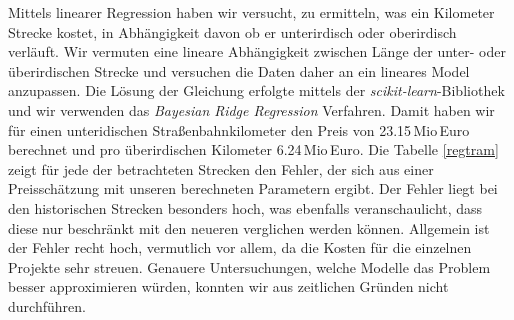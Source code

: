 Mittels linearer Regression haben wir versucht, zu ermitteln, was ein Kilometer Strecke kostet, in Abhängigkeit davon ob er unterirdisch oder oberirdisch verläuft. Wir vermuten eine lineare Abhängigkeit zwischen Länge der unter- oder überirdischen Strecke und versuchen die Daten daher an ein lineares Model anzupassen. Die Lösung der Gleichung erfolgte mittels der \textit{scikit-learn}-Bibliothek und wir verwenden das \emph{Bayesian Ridge Regression} Verfahren. Damit haben wir für einen unteridischen Straßenbahnkilometer den Preis von 23.15\,Mio\,Euro berechnet und pro überirdischen Kilometer 6.24\,Mio\,Euro. Die Tabelle \ref{regtram} zeigt für jede der betrachteten Strecken den Fehler, der sich aus einer Preisschätzung mit unseren berechneten Parametern ergibt. Der Fehler liegt bei den historischen Strecken besonders hoch, was ebenfalls veranschaulicht, dass diese nur beschränkt mit den neueren verglichen werden können. Allgemein ist der Fehler recht hoch, vermutlich vor allem, da die Kosten für die einzelnen Projekte sehr streuen. Genauere Untersuchungen, welche Modelle das Problem besser approximieren würden, konnten wir aus zeitlichen Gründen nicht durchführen.
\enlargethispage{1cm}
